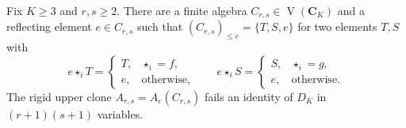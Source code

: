 \begin{proposition}\label{core:prop:grid-countermodel}
Fix $K\geq3$ and $r,s\geq2$. There are a finite algebra
$C_{r,s}\in\operatorname V(\mathbf C_K)$ and a reflecting element
$e\in C_{r,s}$ such that $(C_{r,s})_{\leq e}=\{T,S,e\}$ for two elements
$T,S$ with
\[
 e\star_iT=\begin{cases}T,&\star_i=f,\\e,&\text{otherwise},\end{cases}
 \qquad
 e\star_iS=\begin{cases}S,&\star_i=g,\\e,&\text{otherwise}.\end{cases}
\]
The rigid upper clone $A_{r,s}=A_e(C_{r,s})$ fails an identity of $D_K$ in
$(r+1)(s+1)$ variables.
\end{proposition}
